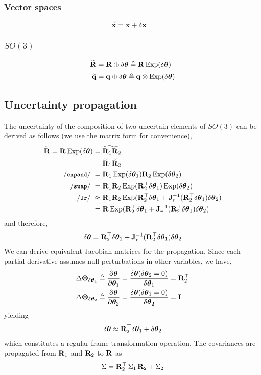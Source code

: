\subsubsection{Vector spaces}
\begin{align*}
\widetilde{{\bf x}}&={\bf x}+\delta{\bf x}
\end{align*}
\subsubsection{$SO(3)$}
\begin{align*}
\widetilde{{\bf R}}&={\bf R}\oplus{\delta{{\bm \theta}}}\triangleq{\bf R}\operatorname*{Exp}(\delta{{\bm \theta}}) \\
\widetilde{{\bf q}}&={\bf q}\oplus{\delta{{\bm \theta}}}\triangleq{\bf q}\otimes\operatorname*{Exp}(\delta{{\bm \theta}})
\end{align*}

\subsection{Uncertainty propagation}

%
The uncertainty of the composition of two uncertain elements of $SO(3)$ can be derived as follows (we use the matrix form for convenience),
%
\begin{align*}
\widetilde\bfR = \bfR\Exp(\dth) 
&= \widetilde{\bfR_1\bfR_2} \\
&= \widetilde\bfR_1\widetilde\bfR_2 \\
\cexpand
&= \bfR_1\Exp(\dth_1)\bfR_2\Exp(\dth_2) \\
\cswap
&= \bfR_1\bfR_2\Exp(\bfR_2\tr\dth_1)\Exp(\dth_2) \\
\cJr
&\approx \bfR_1\bfR_2\Exp(\bfR_2\tr\dth_1+\bfJ_r\inv(\bfR_2\tr\dth_1)\dth_2) \\
&= \bfR\Exp(\bfR_2\tr\dth_1+\bfJ_r\inv(\bfR_2\tr\dth_1)\dth_2) 
\end{align*}
%
and therefore,
%
\begin{align}
{\delta{{\bm \theta}}} = {\bf R}_2^{\top}{\delta{{\bm \theta}}}_1+{\bf J}_r^{-1}({\bf R}_2^{\top}{\delta{{\bm \theta}}}_1){\delta{{\bm \theta}}}_2
\end{align}
%
We can derive equivalent Jacobian matrices for the propagation. Since each partial derivative assumes null perturbations in  other variables, we have,
%
\begin{align}
{\Delta{\bm \Theta}}_{{\delta{{\bm \theta}}}_1} \triangleq \frac{\partial{{\bm \theta}}}{\partial{{\bm \theta}}_1} &= \frac{{\delta{{\bm \theta}}}({\delta{{\bm \theta}}}_2=0)}{{\delta{{\bm \theta}}}_1} = {\bf R}_2^{\top} \\
{\Delta{\bm \Theta}}_{{\delta{{\bm \theta}}}_2} \triangleq \frac{\partial{{\bm \theta}}}{\partial{{\bm \theta}}_2} &= \frac{{\delta{{\bm \theta}}}({\delta{{\bm \theta}}}_1=0)}{{\delta{{\bm \theta}}}_2} = {\bf I}
\end{align}
%
yielding
%
\begin{align}
{\delta{{\bm \theta}}} \approx {\bf R}_2^{\top}{\delta{{\bm \theta}}}_1+{\delta{{\bm \theta}}}_2
\end{align}
%
which constitutes a regular frame transformation operation. The covariances are propagated from ${\bf R}_1$ and ${\bf R}_2$ to ${\bf R}$ as 
%
\begin{align*}
\Sigma = {\bf R}_2^{\top}\,\Sigma_1\,{\bf R}_2 + \Sigma_2
\end{align*}

